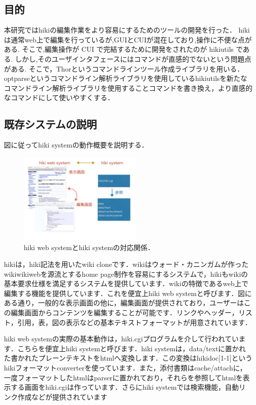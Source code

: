 \subsection{目的}
本研究ではhikiの編集作業をより容易にするためのツールの開発を行った． 
hikiは通常web上で編集を行っているが,GUIとCUIが混在しており,操作に不便な点がある. 
そこで,編集操作が CUI で完結するために開発をされたのが hikiutils である. 
しかし,そのユーザインタフェースにはコマンドが直感的でないという問題点がある. 
そこで，Thorというコマンドラインツール作成ライブラリを用いる．
optparseというコマンドライン解析ライブラリを使用しているhikiutilsを新たなコマンドライン解析ライブラリを使用することコマンドを書き換え，より直感的なコマンドにして使いやすくする．

\subsection{既存システムの説明}
図に従ってhiki systemの動作概要を説明する．

\begin{figure}[htbp]\begin{center}
\includegraphics[width=6cm,bb=0 0 442 500]{../figs/./hikiutils_yamane.006.jpeg}
\caption{hiki web systemとhiki systemの対応関係．}
\label{default}\end{center}\end{figure}
hikiは，hiki記法を用いたwiki cloneです．wikiはウォード・カニンガムが作ったwikiwikiwebを源流とするhome page制作を容易にするシステムで，hikiもwikiの基本要求仕様を満足するシステムを提供しています．wikiの特徴であるweb上で編集する機能を提供しています．これを便宜上hiki web systemと呼びます．図にある通り，一般的な表示画面の他に，編集画面が提供されており，ユーザーはこの編集画面からコンテンツを編集することが可能です．リンクやヘッダー，リスト，引用，表，図の表示などの基本テキストフォーマットが用意されています．

hiki web systemの実際の基本動作は，hiki.cgiプログラムを介して行われています．こちらを便宜上hiki systemと呼びます．hiki systemは，data/textに置かれた書かれたプレーンテキストをhtmlへ変換します．この変換はhikidoc[1-1]というhikiフォーマットconverterを使っています．また，添付書類はcache/attachに，一度フォーマットしたhtmlはparserに置かれており，それらを参照してhtmlを表示する画面をhiki.cgiは作っています．さらにhiki systemでは検索機能，自動リンク作成などが提供されています

